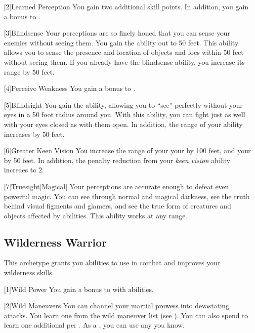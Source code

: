         [2]{Learned Perception} You gain two additional skill points.
        In addition, you gain a  bonus to .

        [3]{Blindsense}
        Your perceptions are so finely honed that you can sense your enemies without seeing them.
        You gain the  ability out to 50 feet.
        This ability allows you to sense the presence and location of objects and foes within 50 feet without seeing them.
        If you already have the blindsense ability, you increase its range by 50 feet.

        [4]{Perceive Weakness}
        You gain a  bonus to .

        [5]{Blindsight}
        You gain the  ability, allowing you to ``see'' perfectly without your eyes in a 50 foot radius around you.
        With this ability, you can fight just as well with your eyes closed as with them open.
        In addition, the range of your  ability increases by 50 feet.

        [6]{Greater Keen Vision}
        You increase the range of your your  by 100 feet, and your  by 50 feet.
        In addition, the penalty reduction from your \textit{keen vision} ability increaes to 2.

        [7]{Truesight}[Magical]
        Your perceptions are accurate enough to defeat even powerful magic.
        You can see through normal and magical darkness, see the truth behind visual figments and glamers, and see the true form of creatures and objects affected by  abilities.
        This ability works at any range.

    \subsection{Wilderness Warrior}
        This archetype grants you abilities to use in combat and improves your wilderness skills.

        [1]{Wild Power} You gain a  bonus to  with  abilities.

        [2]{Wild Maneuvers} 
        You can channel your martial prowess into devastating attacks.
        You learn one  from the wild maneuver list (see ).
        You can also spend  to learn one additional  per .
        As a , you can use any  you know.

